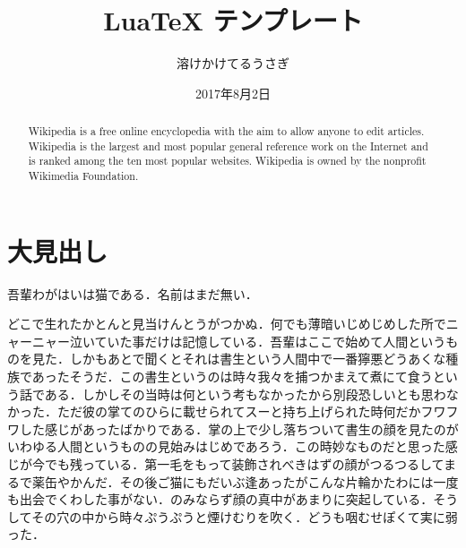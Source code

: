 \documentclass[10pt,a4paper]{ltjsarticle}           %
\begin{document}
\title{LuaTeX テンプレート}
\author{溶けかけてるうさぎ}
\date{2017年8月2日}
\maketitle

\thispagestyle{fancy}
\pagestyle{fancy}


\renewcommand{\abstractname}{Abstract}
\begin{abstract}
Wikipedia is a free online encyclopedia with the aim to allow anyone to edit articles. Wikipedia is the largest and most popular general reference work on the Internet and is ranked among the ten most popular websites. Wikipedia is owned by the nonprofit Wikimedia Foundation.
\end{abstract}


\section{大見出し}
吾輩わがはいは猫である．名前はまだ無い．

どこで生れたかとんと見当けんとうがつかぬ．何でも薄暗いじめじめした所でニャーニャー泣いていた事だけは記憶している．吾輩はここで始めて人間というものを見た．しかもあとで聞くとそれは書生という人間中で一番獰悪どうあくな種族であったそうだ．この書生というのは時々我々を捕つかまえて煮にて食うという話である．しかしその当時は何という考もなかったから別段恐しいとも思わなかった．ただ彼の掌てのひらに載せられてスーと持ち上げられた時何だかフワフワした感じがあったばかりである．掌の上で少し落ちついて書生の顔を見たのがいわゆる人間というものの見始みはじめであろう．この時妙なものだと思った感じが今でも残っている．第一毛をもって装飾されべきはずの顔がつるつるしてまるで薬缶やかんだ．その後ご猫にもだいぶ逢あったがこんな片輪かたわには一度も出会でくわした事がない．のみならず顔の真中があまりに突起している．そうしてその穴の中から時々ぷうぷうと煙けむりを吹く．どうも咽むせぽくて実に弱った．
\end{document}
